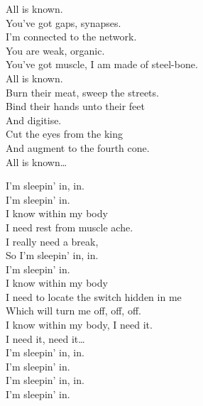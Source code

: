 All is known. \\

You've got gaps, synapses. \\
I'm connected to the network. \\
You are weak, organic. \\
You've got muscle, I am made of steel-bone. \\

All is known. \\

Burn their meat, sweep the streets. \\
Bind their hands unto their feet \\
And digitise. \\
Cut the eyes from the king \\
And augment to the fourth cone. \\

All is known… \\





I'm sleepin' in, in. \\
I'm sleepin' in. \\

I know within my body \\
I need rest from muscle ache. \\
I really need a break, \\
So I'm sleepin' in, in. \\
I'm sleepin' in. \\

I know within my body \\
I need to locate the switch hidden in me \\
Which will turn me off, off, off. \\
I know within my body, I need it. \\

I need it, need it… \\

I'm sleepin' in, in. \\
I'm sleepin' in. \\
I'm sleepin' in, in. \\
I'm sleepin' in. \\


